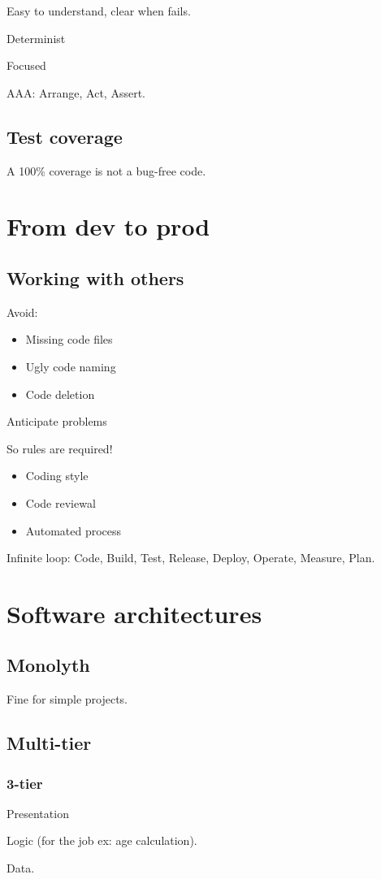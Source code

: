 \documentclass[a4paper,11pt]{article}
\newcommand{\ls}{\begin{itemize}}
\newcommand{\li}{\item}
\newcommand{\lend}{\end{itemize}}
\begin{document}
Easy to understand, clear when fails.

Determinist

Focused

AAA: Arrange, Act, Assert.

\subsection{Test coverage}

A 100\% coverage is not a bug-free code.

\section{From dev to prod}

\subsection{Working with others}

Avoid:

\ls
\li Missing code files
\li Ugly code naming
\li Code deletion
\lend

Anticipate problems

So rules are required!
\ls
\li Coding style
\li Code reviewal
\li Automated process
\lend

Infinite loop: Code, Build, Test, Release, Deploy, Operate, Measure, Plan.

\section{Software architectures}

\subsection{Monolyth}

Fine for simple projects.

\subsection{Multi-tier}

\subsubsection{3-tier}

Presentation

Logic (for the job ex: age calculation).

Data.
\end{document}
